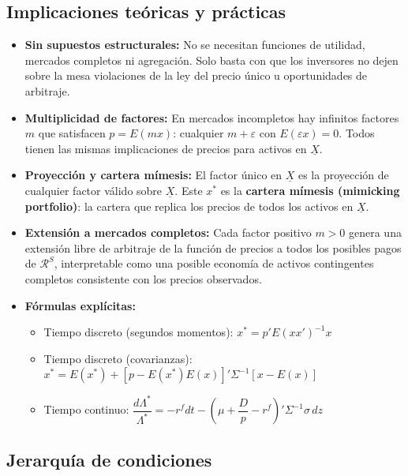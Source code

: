 \documentclass[12pt]{article}
\begin{document}
\subsection{Implicaciones te\'oricas y pr\'acticas}

\begin{itemize}
    \item \textbf{Sin supuestos estructurales:} No se necesitan funciones de utilidad, mercados completos ni agregaci\'on. Solo basta con que los inversores no dejen sobre la mesa violaciones de la ley del precio \'unico u oportunidades de arbitraje.

    \item \textbf{Multiplicidad de factores:} En mercados incompletos hay infinitos factores $m$ que satisfacen $p = E(mx)$: cualquier $m + \varepsilon$ con $E(\varepsilon x) = 0$. Todos tienen las mismas implicaciones de precios para activos en $\underline{X}$.

    \item \textbf{Proyecci\'on y cartera m\'imesis:} El factor \'unico en $\underline{X}$ es la proyecci\'on de cualquier factor v\'alido sobre $\underline{X}$. Este $x^*$ es la \textbf{cartera m\'imesis (mimicking portfolio)}: la cartera que replica los precios de todos los activos en $\underline{X}$.

    \item \textbf{Extensi\'on a mercados completos:} Cada factor positivo $m > 0$ genera una extensi\'on libre de arbitraje de la funci\'on de precios a todos los posibles pagos de $\mathcal{R}^S$, interpretable como una posible econom\'ia de activos contingentes completos consistente con los precios observados.

    \item \textbf{F\'ormulas expl\'icitas:}
    \begin{itemize}
        \item Tiempo discreto (segundos momentos): $x^* = p'E(xx')^{-1}x$
        \item Tiempo discreto (covarianzas): $x^* = E(x^*) + [p - E(x^*)E(x)]'\Sigma^{-1}[x - E(x)]$
        \item Tiempo continuo: $\dfrac{d\Lambda^*}{\Lambda^*} = -r^f dt - \left(\mu + \dfrac{D}{p} - r^f\right)'\Sigma^{-1}\sigma\, dz$
    \end{itemize}
\end{itemize}

\subsection{Jerarqu\'ia de condiciones}
\end{document}

